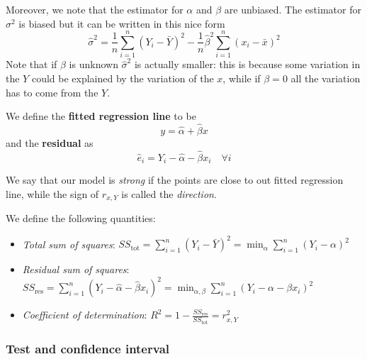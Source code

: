 \documentclass[12pt]{extarticle}
\begin{document}
Moreover, we note that the estimator for $\alpha$ and $\beta$ are unbiased.
The estimator for $\sigma^2$ is biased but it can be written in this nice form
\begin{equation}
    \hat \sigma^2 = \frac{1}{n}\sum_{i = 1}^n (Y_i - \bar Y)^2 - \frac{1}{n} \hat \beta^2 \sum_{i = 1}^n (x_i - \bar x)^2
\end{equation}
Note that if $\beta$ is unknown $\hat \sigma^2$ is actually smaller:
this is because some variation in the $Y$ could be explained by the variation of the $x$,
while if $\beta = 0$ all the variation has to come from the $Y$.

We define the \textbf{fitted regression line} to be
\begin{equation}
    y = \hat \alpha + \hat \beta x
\end{equation}
and the \textbf{residual} as
\begin{equation}
    \hat e_i = Y_i - \hat \alpha - \hat \beta x_i \quad \forall i
\end{equation}

We say that our model is \emph{strong} if the points are close to out fitted regression line,
while the sign of $r_{x, Y}$ is called the \emph{direction}.

We define the following quantities:
\begin{itemize}
    \item \emph{Total sum of squares}: $SS_\text{tot} = \sum_{i = 1}^n (Y_i - \bar Y)^2 = \min_\alpha \sum_{i = 1}^n (Y_i - \alpha)^2$
    \item \emph{Residual sum of squares}: $SS_\text{res} = \sum_{i = 1}^n (Y_i - \hat \alpha - \hat \beta x_i)^2 = \min_{\alpha, \beta} \sum_{i = 1}^n (Y_i - \alpha - \beta x_i)^2$
    \item \emph{Coefficient of determination}: $R^2 = 1 - \frac{SS_\text{res}}{SS_\text{tot}} = r^2_{x, Y}$
\end{itemize}

\subsubsection{Test and confidence interval}
\end{document}
